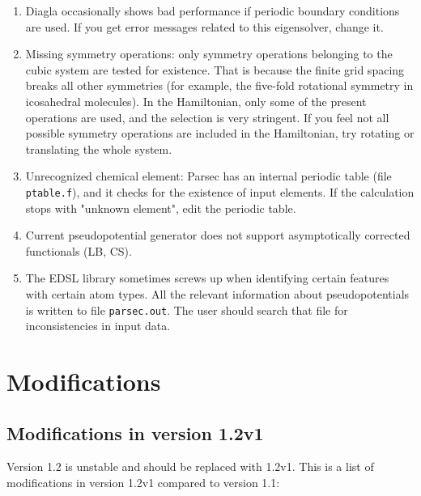 \documentclass{article}
\begin{document}
\begin{enumerate}
\item Diagla occasionally shows bad performance if periodic boundary
  conditions are used. If you get error messages related to this
  eigensolver, change it.

\item Missing symmetry operations: only symmetry operations belonging
  to the cubic system are tested for existence. That is because the
  finite grid spacing breaks all other symmetries (for example, the
  five-fold rotational symmetry in icosahedral molecules). In the
  Hamiltonian, only some of the present operations are used, and the
  selection is very stringent. If you feel not all possible symmetry
  operations are included in the Hamiltonian, try rotating or
  translating the whole system.

\item Unrecognized chemical element: Parsec has an internal periodic
  table (file {\tt ptable.f}), and it checks for the existence of
  input elements. If the
  calculation stops with "unknown element", edit the periodic table.

\item Current pseudopotential generator does not support asymptotically
   corrected functionals (LB, CS).

\item The EDSL library sometimes screws up when identifying
certain features with certain atom types. All the relevant information
about pseudopotentials is written to file {\tt parsec.out}. The user
should search that file for inconsistencies in input data.
\end{enumerate}








\section{Modifications}

\subsection{Modifications in version 1.2v1}

Version 1.2 is unstable and should be replaced with 1.2v1.
This is a list of modifications in version 1.2v1 compared to
version 1.1:
\end{document}
